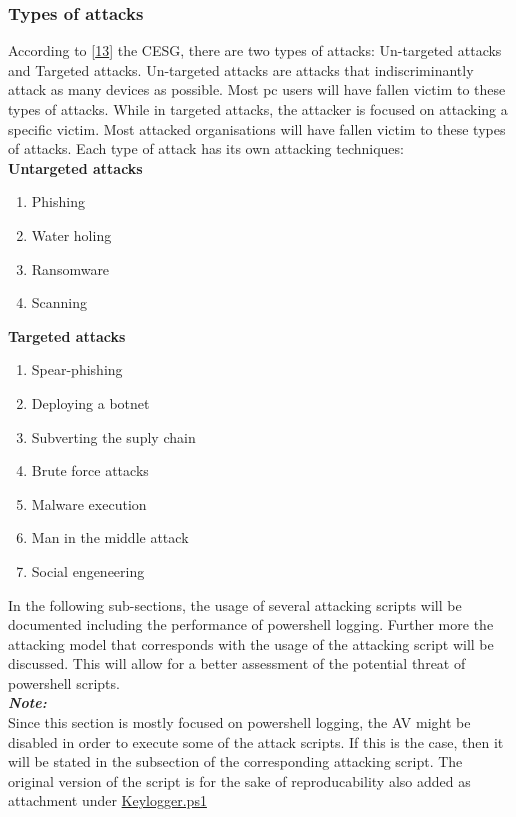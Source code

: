 \documentclass{article}%
\begin{document}
\subsubsection{Types of attacks}
According to [\hyperlink{13}{13}] the CESG, there are two types of attacks: Un-targeted attacks and Targeted attacks. Un-targeted attacks are attacks that indiscriminantly attack as many devices as possible. Most pc users will have fallen victim to these types of attacks. While in targeted attacks, the attacker is focused on attacking a specific victim. Most attacked organisations will have fallen victim to these types of attacks. Each type of attack has its own attacking techniques:\\
\textbf{Untargeted attacks}
\begin{enumerate}
	\item Phishing
	\item Water holing
	\item Ransomware
	\item Scanning
\end{enumerate}
\textbf{Targeted attacks}
\begin{enumerate}
	\item Spear-phishing
	\item Deploying a botnet
	\item Subverting the suply chain
	\item Brute force attacks
	\item Malware execution
	\item Man in the middle attack
	\item Social engeneering
\end{enumerate}
In the following sub-sections, the usage of several attacking scripts will be documented including the performance of powershell logging. Further more the attacking model that corresponds with the usage of the attacking script will be discussed. This will allow for a better assessment of the potential threat of powershell scripts.\\
\newline
\textbf{\textit{Note:}}\\
Since this section is mostly focused on powershell logging, the AV might be disabled in order to execute some of the attack scripts. If this is the case, then it will be stated in the subsection of the corresponding attacking script. The original version of the script is for the sake of reproducability also added as attachment under \hyperlink{scrip2}{Keylogger.ps1}
\end{document}
